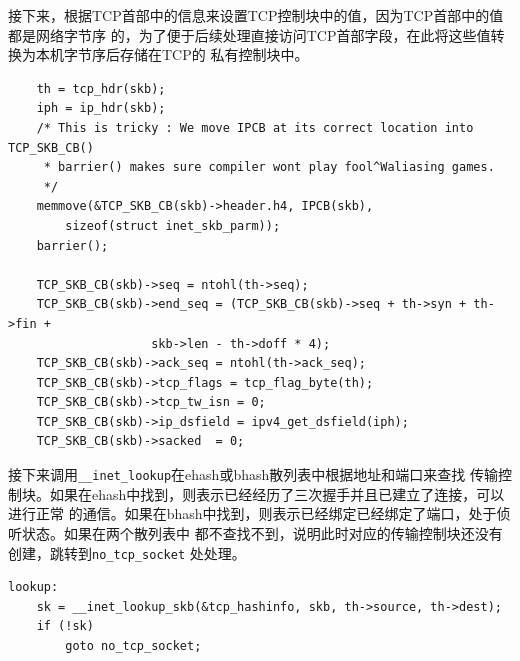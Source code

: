     接下来，根据TCP首部中的信息来设置TCP控制块中的值，因为TCP首部中的值都是网络字节序
    的，为了便于后续处理直接访问TCP首部字段，在此将这些值转换为本机字节序后存储在TCP的
    私有控制块中。
\begin{verbatim}
    th = tcp_hdr(skb);
    iph = ip_hdr(skb);
    /* This is tricky : We move IPCB at its correct location into TCP_SKB_CB()
     * barrier() makes sure compiler wont play fool^Waliasing games.
     */
    memmove(&TCP_SKB_CB(skb)->header.h4, IPCB(skb),
        sizeof(struct inet_skb_parm));
    barrier();

    TCP_SKB_CB(skb)->seq = ntohl(th->seq);
    TCP_SKB_CB(skb)->end_seq = (TCP_SKB_CB(skb)->seq + th->syn + th->fin +
                    skb->len - th->doff * 4);
    TCP_SKB_CB(skb)->ack_seq = ntohl(th->ack_seq);
    TCP_SKB_CB(skb)->tcp_flags = tcp_flag_byte(th);
    TCP_SKB_CB(skb)->tcp_tw_isn = 0;
    TCP_SKB_CB(skb)->ip_dsfield = ipv4_get_dsfield(iph);
    TCP_SKB_CB(skb)->sacked  = 0;
\end{verbatim}
    
    接下来调用\texttt{__inet_lookup}在ehash或bhash散列表中根据地址和端口来查找
    传输控制块。如果在ehash中找到，则表示已经经历了三次握手并且已建立了连接，可以进行正常
    的通信。如果在bhash中找到，则表示已经绑定已经绑定了端口，处于侦听状态。如果在两个散列表中
    都不查找不到，说明此时对应的传输控制块还没有创建，跳转到\texttt{no_tcp_socket}
    处处理。
\begin{verbatim}
lookup:
    sk = __inet_lookup_skb(&tcp_hashinfo, skb, th->source, th->dest);
    if (!sk)
        goto no_tcp_socket;
\end{verbatim}
    
